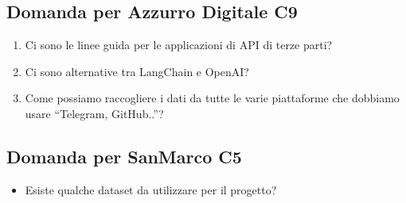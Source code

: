 \documentclass{article}
\begin{document}
\subsection{Domanda per Azzurro Digitale C9}

\begin{enumerate}
    \item Ci sono le linee guida per le applicazioni di API di terze parti?
    \item Ci sono alternative tra LangChain e OpenAI?
    \item Come possiamo raccogliere i dati da tutte le varie piattaforme che dobbiamo usare “Telegram, GitHub..”?
\end{enumerate}

\subsection{Domanda per SanMarco C5}
\begin{itemize}
    \item Esiste qualche dataset da utilizzare per il progetto?
\end{itemize}
\end{document}
